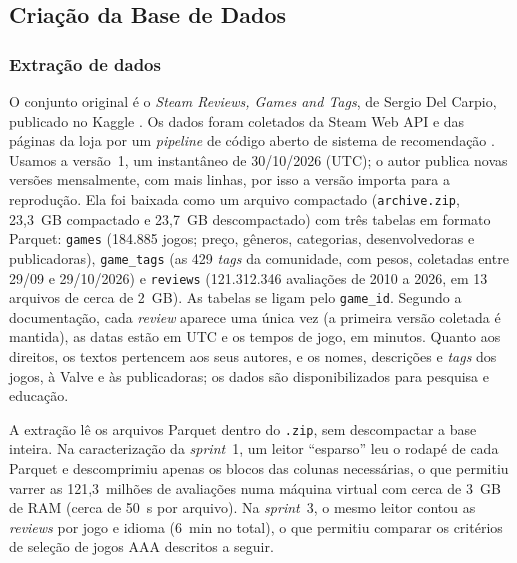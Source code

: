 \documentclass[12pt]{article}
\begin{document}
\subsection{Criação da Base de Dados}\label{sec:base}

\subsubsection{Extração de dados}

O conjunto original é o \textit{Steam Reviews, Games and Tags}, de Sergio Del Carpio, publicado no Kaggle \cite{dataset}. Os dados foram coletados da Steam Web API e das páginas da loja por um \textit{pipeline} de código aberto de sistema de recomendação \cite{pipeline}. Usamos a versão~1, um instantâneo de 30/10/2026 (UTC); o autor publica novas versões mensalmente, com mais linhas, por isso a versão importa para a reprodução. Ela foi baixada como um arquivo compactado
(\texttt{archive.zip}, 23,3~GB compactado e 23,7~GB descompactado) com três tabelas em formato
Parquet: \texttt{games} (184.885 jogos; preço, gêneros, categorias, desenvolvedoras e
publicadoras), \texttt{game\_tags} (as 429 \textit{tags} da comunidade, com pesos, coletadas entre
29/09 e 29/10/2026) e \texttt{reviews} (121.312.346 avaliações de 2010 a 2026, em 13 arquivos de
cerca de 2~GB). As tabelas se ligam pelo \texttt{game\_id}.
Segundo a documentação, cada \textit{review} aparece uma única vez (a primeira versão coletada é mantida), as datas estão em UTC e os tempos de jogo, em minutos. Quanto aos direitos, os textos pertencem aos seus autores, e os nomes, descrições e \textit{tags} dos jogos, à Valve e às publicadoras; os dados são disponibilizados para pesquisa e educação.

A extração lê os arquivos Parquet dentro do \texttt{.zip}, sem descompactar a base inteira. Na
caracterização da \textit{sprint}~1, um leitor ``esparso'' leu o rodapé de cada Parquet e
descomprimiu apenas os blocos das colunas necessárias, o que permitiu varrer as 121,3~milhões de
avaliações numa máquina virtual com cerca de 3~GB de RAM (cerca de 50~s por arquivo). Na
\textit{sprint}~3, o mesmo leitor contou as \textit{reviews} por jogo e idioma (6~min no total), o
que permitiu comparar os critérios de seleção de jogos AAA descritos a seguir.
\end{document}
